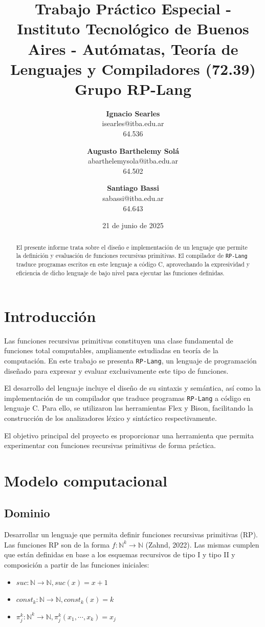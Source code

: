 \documentclass{article}
\title{\textbf{Trabajo Práctico Especial - \rplang{}} \\ [1ex]
\large Instituto Tecnológico de Buenos Aires - Autómatas, Teoría de Lenguajes y Compiladores (72.39) \\ [1ex]
\large Grupo RP-Lang}
\date{21 de junio de 2025}
\author{
\textbf{Ignacio Searles}\\
isearles@itba.edu.ar\\
64.536
\and
\textbf{Augusto Barthelemy Solá}\\
abarthelemysola@itba.edu.ar\\
64.502
\and
\textbf{Santiago Bassi}\\
sabassi@itba.edu.ar\\
64.643
}
\newcommand{\rplang}{\texttt{RP-Lang}}
\begin{document}
\maketitle

\begin {abstract}

El presente informe trata sobre el diseño e implementación de un lenguaje que permite la definición y evaluación de funciones recursivas primitivas. El compilador de \rplang{} traduce programas escritos en este lenguaje a código C, aprovechando la expresividad y eficiencia de dicho lenguaje de bajo nivel para ejecutar las funciones definidas. 

\end {abstract}

\tableofcontents

\section {Introducción}

Las funciones recursivas primitivas constituyen una clase fundamental de funciones total computables, ampliamente estudiadas en teoría de la computación. En este trabajo se presenta \rplang{}, un lenguaje de programación diseñado para expresar y evaluar exclusivamente este tipo de funciones.

El desarrollo del lenguaje incluye el diseño de su sintaxis y semántica, así como la implementación de un compilador que traduce programas \rplang{} a código en lenguaje C. Para ello, se utilizaron las herramientas Flex y Bison, facilitando la construcción de los analizadores léxico y sintáctico respectivamente.

El objetivo principal del proyecto es proporcionar una herramienta que permita experimentar con funciones recursivas primitivas de forma práctica.

\section {Modelo computacional}

\subsection {Dominio}

Desarrollar un lenguaje que permita definir funciones recursivas primitivas (RP). Las funciones RP son de la forma $f:\mathbb N^k\to\mathbb N$ (Zahnd, 2022). Las mismas cumplen que están definidas en base a los esquemas recursivos de tipo I y tipo II y composición a partir de las funciones iniciales:
\begin{itemize}
\item $suc:\mathbb N \to \mathbb N, suc(x) = x + 1$
\item $const_k:\mathbb N \to \mathbb N, const_k(x) = k$
\item $\pi^k_j:\mathbb N^k \to \mathbb N, \pi^k_j(x_1, \cdots, x_k) = x_j$
\end{itemize}
\end{document}
